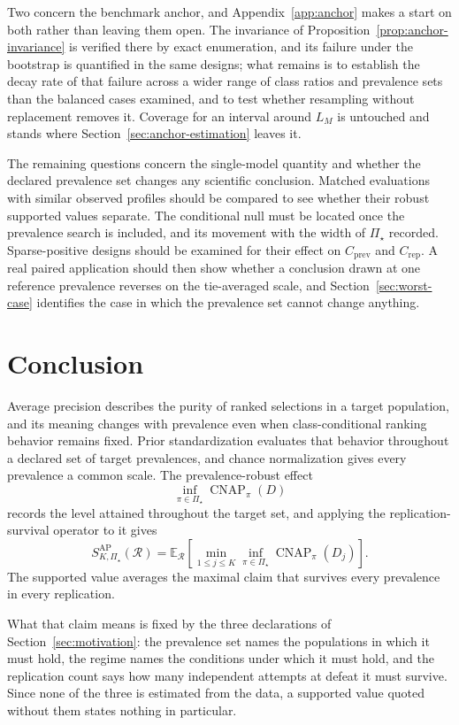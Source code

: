\documentclass[11pt]{article}
\newcommand{\CNAP}{\operatorname{CNAP}}
\newcommand{\Regime}{\mathcal{R}}
\newcommand{\PSet}{\Pi_\star}
\newcommand{\E}{\mathbb{E}}
\theoremstyle{remark}
\begin{document}
Two concern the benchmark anchor, and Appendix~\ref{app:anchor} makes a start on both rather than leaving them open. The invariance of Proposition~\ref{prop:anchor-invariance} is verified there by exact enumeration, and its failure under the bootstrap is quantified in the same designs; what remains is to establish the decay rate of that failure across a wider range of class ratios and prevalence sets than the balanced cases examined, and to test whether resampling without replacement removes it. Coverage for an interval around $L_M$ is untouched and stands where Section~\ref{sec:anchor-estimation} leaves it.

The remaining questions concern the single-model quantity and whether the declared prevalence set changes any scientific conclusion. Matched evaluations with similar observed profiles should be compared to see whether their robust supported values separate. The conditional null must be located once the prevalence search is included, and its movement with the width of $\PSet$ recorded. Sparse-positive designs should be examined for their effect on $C_{\mathrm{prev}}$ and $C_{\mathrm{rep}}$. A real paired application should then show whether a conclusion drawn at one reference prevalence reverses on the tie-averaged scale, and Section~\ref{sec:worst-case} identifies the case in which the prevalence set cannot change anything.

\section{Conclusion}

Average precision describes the purity of ranked selections in a target population, and its meaning changes with prevalence even when class-conditional ranking behavior remains fixed. Prior standardization evaluates that behavior throughout a declared set of target prevalences, and chance normalization gives every prevalence a common scale. The prevalence-robust effect
\[
\inf_{\pi\in\PSet}\CNAP_\pi(D)
\]
records the level attained throughout the target set, and applying the replication-survival operator to it gives
\[
S_{K,\PSet}^{\mathrm{AP}}(\Regime)
=
\E_{\Regime}
\left[
\min_{1\leq j\leq K}
\inf_{\pi\in\PSet}
\CNAP_\pi(D_j)
\right].
\]
The supported value averages the maximal claim that survives every prevalence in every replication.

What that claim means is fixed by the three declarations of Section~\ref{sec:motivation}: the prevalence set names the populations in which it must hold, the regime names the conditions under which it must hold, and the replication count says how many independent attempts at defeat it must survive. Since none of the three is estimated from the data, a supported value quoted without them states nothing in particular.
\end{document}
